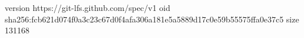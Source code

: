 version https://git-lfs.github.com/spec/v1
oid sha256:fcb621d074f0a3c23c67d0f4afa306a181e5a5889d17c0e59b55575ffa0e37c5
size 131168
